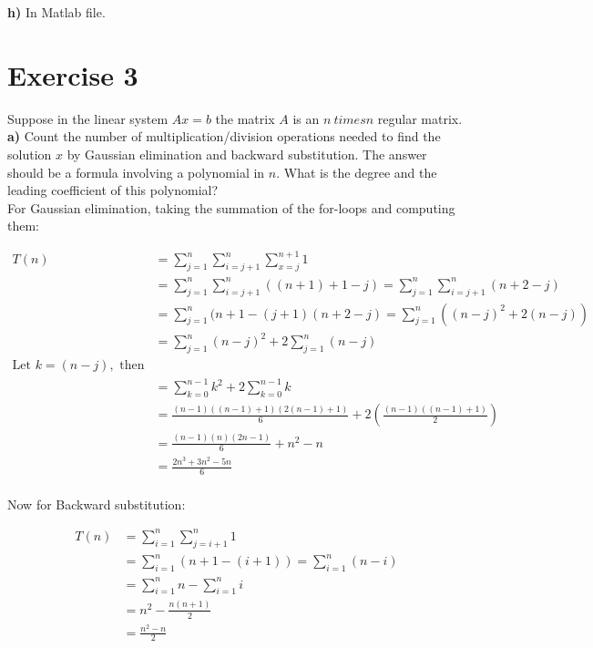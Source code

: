 \documentclass{article}
\begin{document}
{\bf h)} In Matlab file.

\section*{Exercise 3}
Suppose in the linear system $Ax = b$ the matrix $A$ is an $n \
times n$ regular matrix. \\
{\bf a)} Count the number of multiplication/division operations
needed to find the solution $x$ by Gaussian elimination and backward substitution.
The answer should be a formula involving a polynomial in $n$.
What is the degree and the leading coefficient of this polynomial? \\

For Gaussian elimination, taking the summation of the for-loops and computing them:

\begin{align*}
T(n) &= \sum_{j=1}^{n} \sum_{i=j+1}^{n} \sum_{x=j}^{n+1} 1 \\
     &= \sum_{j=1}^{n} \sum_{i=j+1}^{n} ((n+1) + 1 - j) = \sum_{j=1}^{n} \sum_{i=j+1}^{n} (n + 2 - j) \\
     &= \sum_{j=1}^{n} (n+1-(j+1)(n+2-j) = \sum_{j=1}^{n} ((n-j)^2 + 2(n-j)) \\
     &= \sum_{j=1}^{n} (n-j)^2 + 2 \sum_{j=1}^{n} (n-j) \\
     \text{Let } k = (n-j), \text{ then} \\
     &= \sum_{k=0}^{n-1} k^2 + 2 \sum_{k=0}^{n-1} k \\
     &= \frac{(n-1)((n-1)+1)(2(n-1)+1)}{6} + 2(\frac{(n-1)((n-1)+1)}{2})\\
     &= \frac{(n-1)(n)(2n-1)}{6} + n^2 - n \\
     &= \frac{2n^3 + 3n^2 - 5n}{6}
\end{align*} \\

Now for Backward substitution:

\begin{align*}
T(n) &= \sum_{i=1}^{n} \sum_{j=i+1}^{n} 1 \\
     &= \sum_{i=1}^{n} (n+1-(i+1)) = \sum_{i=1}^{n} (n-i) \\
     &= \sum_{i=1}^{n} n - \sum_{i=1}^{n} i \\
     &= n^2 - \frac{n(n+1)}{2} \\
     &= \frac{n^2 - n}{2} \\
\end{align*} \\
\end{document}
